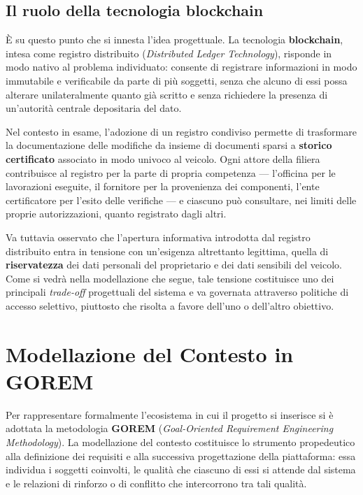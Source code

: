 \subsection*{Il ruolo della tecnologia blockchain}

\`E su questo punto che si innesta l'idea progettuale. La tecnologia \textbf{blockchain}, intesa come registro distribuito (\textit{Distributed Ledger Technology}), risponde in modo nativo al problema individuato: consente di registrare informazioni in modo immutabile e verificabile da parte di pi\`u soggetti, senza che alcuno di essi possa alterare unilateralmente quanto gi\`a scritto e senza richiedere la presenza di un'autorit\`a centrale depositaria del dato.

Nel contesto in esame, l'adozione di un registro condiviso permette di trasformare la documentazione delle modifiche da insieme di documenti sparsi a \textbf{storico certificato} associato in modo univoco al veicolo. Ogni attore della filiera contribuisce al registro per la parte di propria competenza --- l'officina per le lavorazioni eseguite, il fornitore per la provenienza dei componenti, l'ente certificatore per l'esito delle verifiche --- e ciascuno pu\`o consultare, nei limiti delle proprie autorizzazioni, quanto registrato dagli altri.

Va tuttavia osservato che l'apertura informativa introdotta dal registro distribuito entra in tensione con un'esigenza altrettanto legittima, quella di \textbf{riservatezza} dei dati personali del proprietario e dei dati sensibili del veicolo. Come si vedr\`a nella modellazione che segue, tale tensione costituisce uno dei principali \textit{trade-off} progettuali del sistema e va governata attraverso politiche di accesso selettivo, piuttosto che risolta a favore dell'uno o dell'altro obiettivo.

\section{Modellazione del Contesto in GOREM}

Per rappresentare formalmente l'ecosistema in cui il progetto si inserisce si \`e adottata la metodologia \textbf{GOREM} (\textit{Goal-Oriented Requirement Engineering Methodology}). La modellazione del contesto costituisce lo strumento propedeutico alla definizione dei requisiti e alla successiva progettazione della piattaforma: essa individua i soggetti coinvolti, le qualit\`a che ciascuno di essi si attende dal sistema e le relazioni di rinforzo o di conflitto che intercorrono tra tali qualit\`a.

